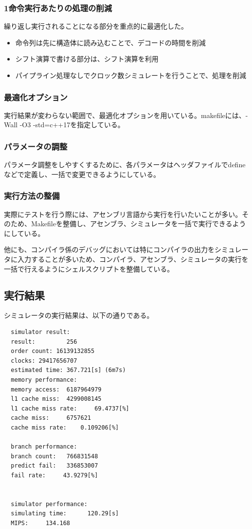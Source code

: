\documentclass[a4paper,11pt]{ltjsarticle}
\begin{document}
\subsubsection*{1命令実行あたりの処理の削減}
繰り返し実行されることになる部分を重点的に最適化した。

\begin{itemize}
  \item 命令列は先に構造体に読み込むことで、デコードの時間を削減
  \item シフト演算で書ける部分は、シフト演算を利用
  \item パイプライン処理なしでクロック数シミュレートを行うことで、処理を削減
\end{itemize}

\subsubsection*{最適化オプション}
実行結果が変わらない範囲で、最適化オプションを用いている。makefileには、-Wall -O3 -std=c++17を指定している。

\subsubsection*{パラメータの調整}
パラメータ調整をしやすくするために、各パラメータはヘッダファイルでdefineなどで定義し、一括で変更できるようにしている。

\subsubsection*{実行方法の整備}
実際にテストを行う際には、アセンブリ言語から実行を行いたいことが多い。そのため、Makefileを整備し、アセンブラ、シミュレータを一括で実行できるようにしている。

他にも、コンパイラ係のデバッグにおいては特にコンパイラの出力をシミュレータに入力することが多いため、コンパイラ、アセンブラ、シミュレータの実行を一括で行えるようにシェルスクリプトを整備している。

\subsection*{実行結果}
シミュレータの実行結果は、以下の通りである。

\begin{verbatim}
  simulator result:
  result:         256
  order count: 16139132855
  clocks: 29417656707
  estimated time: 367.721[s] (6m7s)
  memory performance:
  memory access:  6187964979
  l1 cache miss:  4299008145
  l1 cache miss rate:     69.4737[%]
  cache miss:     6757621
  cache miss rate:    0.109206[%]

  branch performance:
  branch count:   766831548
  predict fail:   336853007
  fail rate:     43.9279[%]


  simulator performance:
  simulating time:      120.29[s]
  MIPS:     134.168
\end{verbatim}
\end{document}
